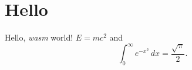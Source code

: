 \documentclass{article}
\begin{document}
\section{Hello}
Hello, \emph{wasm} world! $E = mc^2$ and
\begin{equation}
  \int_0^\infty e^{-x^2}\,dx = \frac{\sqrt{\pi}}{2}.
\end{equation}
\end{document}
